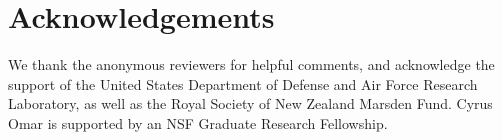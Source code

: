 



\section*{Acknowledgements}
We thank the anonymous reviewers for helpful comments, and acknowledge the support of the United States Department of Defense and Air Force Research Laboratory, as well as the Royal Society of New Zealand Marsden Fund. Cyrus Omar is supported by an NSF Graduate Research Fellowship.
